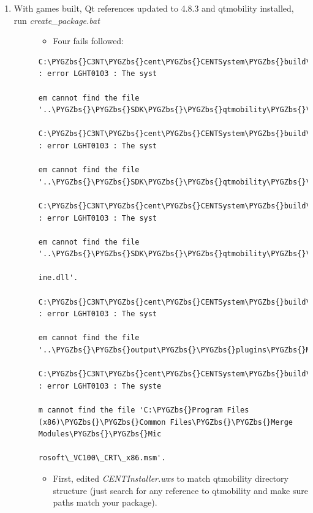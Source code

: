 \documentclass[letterpaper,10pt,english]{sphinxmanual}
\def\PYGZbs{\char`\\}
\begin{document}
\begin{enumerate}
\item {} \begin{description}
\item[{With games built, Qt references updated to 4.8.3 and qtmobility installed, run \emph{create\_package.bat}}] \leavevmode\begin{itemize}
\item {} 
Four fails followed:

\end{itemize}

\begin{Verbatim}[commandchars=\\\{\}]
C:\PYGZbs{}C3NT\PYGZbs{}cent\PYGZbs{}CENTSystem\PYGZbs{}build\PYGZbs{}CENTInstaller.wxs(127) : error LGHT0103 : The syst

em cannot find the file '..\PYGZbs{}\PYGZbs{}SDK\PYGZbs{}\PYGZbs{}qtmobility\PYGZbs{}\PYGZbs{}bin\PYGZbs{}\PYGZbs{}QtMultimediaKit1.dll'.

C:\PYGZbs{}C3NT\PYGZbs{}cent\PYGZbs{}CENTSystem\PYGZbs{}build\PYGZbs{}CENTInstaller.wxs(140) : error LGHT0103 : The syst

em cannot find the file '..\PYGZbs{}\PYGZbs{}SDK\PYGZbs{}\PYGZbs{}qtmobility\PYGZbs{}\PYGZbs{}bin\PYGZbs{}\PYGZbs{}mediaservice\PYGZbs{}dsengine.dll'.

C:\PYGZbs{}C3NT\PYGZbs{}cent\PYGZbs{}CENTSystem\PYGZbs{}build\PYGZbs{}CENTInstaller.wxs(144) : error LGHT0103 : The syst

em cannot find the file '..\PYGZbs{}\PYGZbs{}SDK\PYGZbs{}\PYGZbs{}qtmobility\PYGZbs{}\PYGZbs{}bin\PYGZbs{}\PYGZbs{}mediaservice\PYGZbs{}qtmedia\_audioeng

ine.dll'.

C:\PYGZbs{}C3NT\PYGZbs{}cent\PYGZbs{}CENTSystem\PYGZbs{}build\PYGZbs{}CENTInstaller.wxs(159) : error LGHT0103 : The syst

em cannot find the file '..\PYGZbs{}\PYGZbs{}output\PYGZbs{}\PYGZbs{}plugins\PYGZbs{}MediaGamePlugin.dll'.

C:\PYGZbs{}C3NT\PYGZbs{}cent\PYGZbs{}CENTSystem\PYGZbs{}build\PYGZbs{}CENTInstaller.wxs(54) : error LGHT0103 : The syste

m cannot find the file 'C:\PYGZbs{}Program Files (x86)\PYGZbs{}\PYGZbs{}Common Files\PYGZbs{}\PYGZbs{}Merge Modules\PYGZbs{}\PYGZbs{}Mic

rosoft\_VC100\_CRT\_x86.msm'.
\end{Verbatim}
\begin{itemize}
\item {} 
First, edited \emph{CENTInstaller.wxs} to match qtmobility directory structure (just search for any reference to qtmobility and make sure paths match your package).


\end{itemize}
\end{description}
\end{enumerate}
\end{document}

